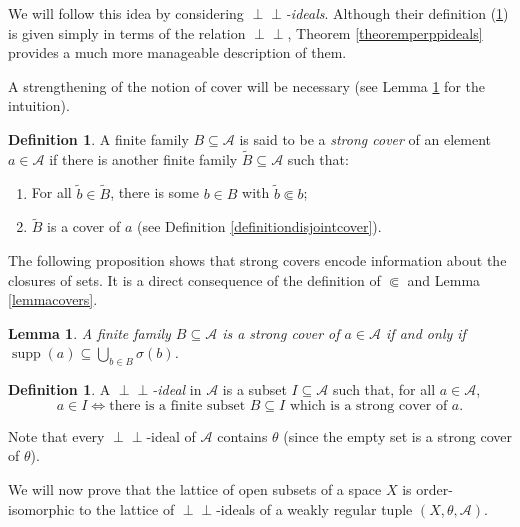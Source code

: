 \documentclass[letter,11pt]{amsart}
\theoremstyle{plain}		\newtheorem{theorem}[generalnumbering]{Theorem}
\theoremstyle{plain}		\newtheorem{corollary}[generalnumbering]{Corollary}
\theoremstyle{definition}		\newtheorem{definition}[generalnumbering]{Definition}
\theoremstyle{definition}		\newtheorem{example}[generalnumbering]{Example}
\theoremstyle{plain}		\newtheorem{proposition}[generalnumbering]{Proposition}
\theoremstyle{plain}		\newtheorem{lemma}[generalnumbering]{Lemma}
\theoremstyle{definition}
\newcommand{\perpp}{\perp\!\!\!\perp}
\DeclareMathOperator{\supp}{supp}
\begin{document}
We will follow this idea by considering \emph{$\perpp$-ideals}. Although their definition (\ref{definitionperppideal}) is given simply in terms of the relation $\perpp$, Theorem \ref{theoremperppideals} provides a much more manageable description of them. 

A strengthening of the notion of cover will be necessary (see Lemma \ref{lemmagoodformofstrongcover} for the intuition).

\begin{definition}\label{definitionstrongcover}
	A finite family $B\subseteq\mathcal{A}$ is said to be a \emph{strong cover} of an element $a\in\mathcal{A}$ if there is another finite family $\widetilde{B}\subseteq\mathcal{A}$ such that:
	\begin{enumerate}[label=(SC\arabic*)]
		\item For all $\widetilde{b}\in\widetilde{B}$, there is some $b\in B$ with $\widetilde{b}\Subset b$;
		\item $\widetilde{B}$ is a cover of $a$ (see Definition \ref{definitiondisjointcover}).
	\end{enumerate}
\end{definition}

The following proposition shows that strong covers encode information about the closures of sets. It is a direct consequence of the definition of $\Subset$ and Lemma \ref{lemmacovers}.

\begin{lemma}\label{lemmagoodformofstrongcover}
	A finite family $B\subseteq\mathcal{A}$ is a strong cover of $a\in\mathcal{A}$ if and only if $\supp(a)\subseteq\bigcup_{b\in B}\sigma(b)$.
\end{lemma}

\begin{definition}\index{Ideal!$\perpp$-ideal}\label{definitionperppideal}
	A \emph{$\perpp$-ideal} in $\mathcal{A}$ is a subset $I\subseteq\mathcal{A}$ such that, for all $a\in\mathcal{A}$,
	\[a\in I\iff \text{there is a finite subset }B\subseteq I\text{ which is a strong cover of }a.\]
\end{definition}

Note that every $\perpp$-ideal of $\mathcal{A}$ contains $\theta$ (since the empty set is a strong cover of $\theta$).

We will now prove that the lattice of open subsets of a space $X$ is order-isomorphic to the lattice of $\perpp$-ideals of a weakly regular tuple $(X,\theta,\mathcal{A})$.
\end{document}
